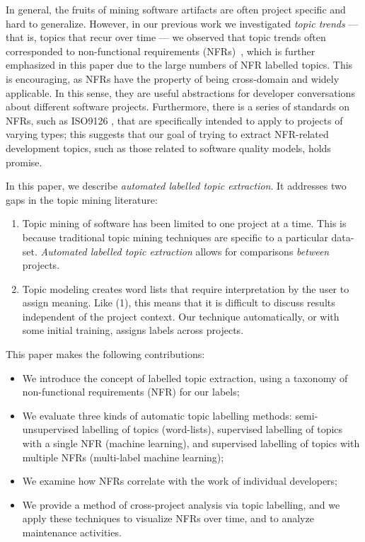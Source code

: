 \documentclass[smallextended]{svjour3}       %
\begin{document}
In general, the fruits of mining software artifacts are often project
specific and hard to generalize.  
However, in our previous work we
investigated \emph{topic trends} --- that is, topics that recur over
time --- we observed that topic trends often corresponded to
non-functional requirements (NFRs)~\cite{Hindle09ICSM}, which is
further emphasized in this paper due to the large numbers of NFR
labelled topics.  
This is encouraging, as NFRs have the property of being cross-domain
and widely applicable. 
In this sense, they are useful abstractions for developer
conversations about different software projects.  
Furthermore, there is a series of standards on NFRs, such as ISO9126 \cite{iso9126}, that are specifically intended to apply to projects of varying
types; this suggests that our goal of trying to extract NFR-related development topics, such as those related to software quality models, holds promise.

In this paper, we describe \emph{automated labelled topic extraction}. It addresses two gaps in the topic mining literature:
\begin{enumerate}
  \item Topic mining of software has been limited to one project at a time. 
This is because traditional topic mining techniques are specific to a particular data-set. 
\textit{Automated labelled topic extraction} allows for comparisons \textit{between} projects. 
  \item Topic modeling creates word lists that require interpretation by the user to assign meaning. 
Like (1), this means
that it is difficult to discuss results independent of the project context. 
Our technique automatically, or with some initial training, assigns labels across projects.
\end{enumerate}

This paper makes the following contributions: 
\begin{itemize}
\item We introduce the concept of labelled topic extraction, using a taxonomy of non-functional requirements (NFR) for our labels; 
\item We evaluate three kinds of automatic topic labelling methods:
  semi-unsupervised labelling  of topics (word-lists), supervised labelling of
  topics with a single NFR (machine learning), 
  and supervised labelling of topics with multiple NFRs (multi-label
  machine learning);
\item We examine how NFRs correlate with the work of individual developers;
\item We provide a method of cross-project analysis via topic labelling, and
we apply these techniques to visualize NFRs over time, and to analyze maintenance activities.

\end{itemize}
\end{document}
